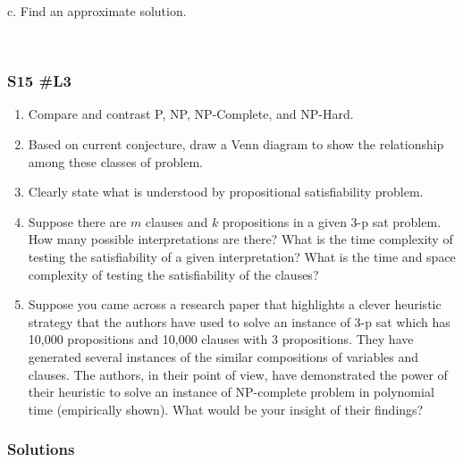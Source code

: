 c.  Find an approximate solution.  

\

\subsubsection{S15 \#L3}

\begin{enumerate}
		\item Compare and contrast P, NP, NP-Complete, and NP-Hard.
		\item Based on current conjecture, draw a Venn diagram to show the relationship among these classes of problem.
		\item Clearly state what is understood by propositional satisfiability problem. 
		\item Suppose there are $m$ clauses and $k$ propositions in a given 3-p sat problem.  How many possible interpretations are there?  What is the time complexity of testing the satisfiability of a given interpretation?  What is the time and space complexity of testing the satisfiability of the clauses?
		\item Suppose you came across a research paper that highlights a clever heuristic strategy that the authors have used to solve an instance of 3-p sat which has 10,000 propositions and 10,000 clauses with 3 propositions.  They have generated several instances of the similar compositions of variables and clauses.  The authors, in their point of view, have demonstrated the power of their heuristic to solve an instance of NP-complete problem in polynomial time (empirically shown).  What would be your insight of their findings?
\end{enumerate}

\subsubsection{Solutions}

